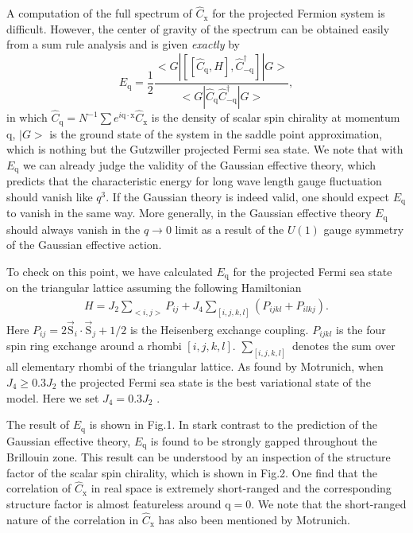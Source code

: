\documentclass[12pt]{article}
\begin{document}
A computation of the full spectrum of $\hat{C}_{\mathrm{x}}$ for the projected Fermion system is difficult. However, the center of gravity of the spectrum can be obtained easily from a sum rule analysis and is given {\it exactly\/} by
\begin{equation}
E_{\mathrm{q}} = \frac{1}{2}\frac{<G|[[\hat{C}_{\mathrm{q}},H],\hat{C}_{-\mathrm{q}}^{\dagger}]|G>}{<G|\hat{C}_{\mathrm{q}}\hat{C}_{-\mathrm{q}}^{\dagger}|G>},
\end{equation}
in which $\hat{C}_{\mathrm{q}}=N^{-1}\sum e^{i\mathrm{q}\cdot \mathrm{x}}\hat{C}_{\mathrm{x}}$ is the density of scalar spin chirality at momentum $\mathrm{q}$, $|G>$ is the ground state of the system in the saddle point approximation, which is nothing but the Gutzwiller projected Fermi sea state. We note that with $E_{\mathrm{q}}$ we can already judge the validity of  the Gaussian effective theory,  which predicts that the characteristic energy for long wave length gauge fluctuation should vanish like $q^{3}$.  If the Gaussian theory is indeed valid, one should expect $E_{\mathrm{q}}$ to vanish in the same way. More generally, in the Gaussian effective theory $E_{\mathrm{q}}$ should always vanish in the $q\to 0$ limit as a result of the $U(1)$ gauge symmetry of the Gaussian effective action. 

To check on this point, we have calculated $E_{\mathrm{q}}$ for the projected Fermi sea state on the triangular lattice assuming the following Hamiltonian
\begin{eqnarray}
H=J_{2}\sum_{<i,j>} P_{ij}+J_{4}\sum_{[i,j,k,l]}(P_{ijkl}+P_{ilkj}).\nonumber
\end{eqnarray}
Here $P_{ij}=2\vec{\mathrm{S}}_{i}\cdot\vec{\mathrm{S}}_{j}+1/2$ is the Heisenberg exchange coupling.  $P_{ijkl}$ is the four spin ring exchange around a rhombi $[i,j,k,l]$. $\sum_{[i,j,k,l]}$ denotes the sum over all elementary rhombi of the triangular lattice. As found by Motrunich\cite{Motrunich}, when $J_{4}\geq 0.3J_{2}$ the projected Fermi sea state is the best variational state of the model. Here we set $J_{4}=0.3J_{2}$ .  

The result of $E_{\mathrm{q}}$ is shown in Fig.1. In stark contrast to the prediction of the Gaussian effective theory, $E_{\mathrm{q}}$ is found to be strongly gapped throughout the Brillouin zone. This result can be understood by an inspection of the structure factor of the scalar spin chirality, which is shown in Fig.2. One find that the correlation of $\hat{C}_{\mathrm{x}}$ in real space is extremely short-ranged and the corresponding structure factor is almost featureless around $\mathrm{q}=0$. We note that the short-ranged nature of the correlation in $\hat{C}_{\mathrm{x}}$ has also been mentioned by Motrunich\cite{Motrunich}. 
\end{document}
